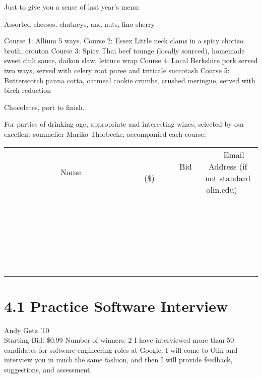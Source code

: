 \documentclass[11pt]{article}
\begin{document}
Just to give you a sense of last year's menu:

Assorted cheeses, chutneys, and nuts, fino sherry

Course 1: Allium 5 ways.  
Course 2: Essex Little neck clams in a spicy chorizo broth, crouton
Course 3: Spicy Thai beef tounge (locally sourced), homemade sweet chili sauce, daikon slaw, lettuce wrap
Course 4: Local Berkshire pork served two ways, served with celery root puree and triticale succotash
Course 5: Butterscotch panna cotta, oatmeal cookie crumbs, crushed meringue, served with birch reduction

Chocolates, port to finish.

For parties of drinking age, appropriate and interesting wines, selected by our excellent sommelier Mariko Thorbecke, accompanied each course.
\\[6ex]
\begin{tabular}{c c c}
~~~~~~~~~~~~~Name~~~~~~~~~~~~~ & ~~~~~~~~~Bid (\$)~~~~~~~~~  & ~~~Email Address (if not standard olin.edu)~~~\\
 & & \\
\hline
 & & \\
\hline
 & & \\
\hline
 & & \\
\hline
 & & \\
\hline
 & & \\
\hline
 & & \\
\hline
 & & \\
\hline
 & & \\
\hline
 & & \\
\hline
 & & \\
\hline
 & & \\
\hline
 & & \\
\hline
 & & \\
\hline
 & & \\
\hline
 & & \\
\hline
 & & \\
\hline
 & & \\
\hline
 & & \\
\hline
 & & \\
\hline
 & & \\
\hline
 & & \\
\hline
 & & \\
\hline
 & & \\
\hline
 & & \\
\hline
 & & \\
\hline
\end{tabular}
\newpage
\section*{4.1 Practice Software Interview}
Andy Getz '10
\\
Starting Bid: \$0.99
\newline
Number of winners: 2
\newline
I have interviewed more than 50 candidates for software engineering roles at Google.  I will come to Olin and interview you in much the same fashion, and then I will provide feedback, suggestions, and assessment.
\end{document}
